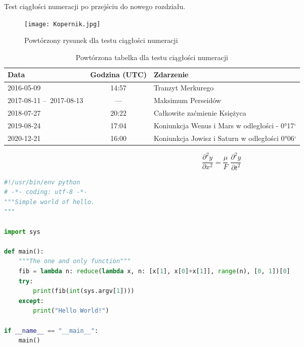 Test ciągłości numeracji po przejściu do nowego rozdziału.


\begin{figure}[!hb]
	\centering \texttt{[image: Kopernik.jpg]}
	\caption{Powtórzony rysunek dla testu ciągłości numeracji}
	\label{rys:kopernik2}
\end{figure}

\begin{table}[!b]
	\centering
	\begin{tabular}{p{2.5cm}c|l}
		Data                     & Godzina (UTC) & Zdarzenie                                     \\\hline
		2016-05-09               & 14:57         & Tranzyt Merkurego                             \\\hline
		2017-08-11 --~2017-08-13 & ---           & Maksimum Perseidów                            \\\hline
		2018-07-27               & 20:22         & Całkowite zaćmienie Księżyca                  \\\hline
		2019-08-24               & 17:04         & Koniunkcja Wenus i Mars w odległości - 0°17`  \\\hline
		2020-12-21               & 16:00         & Koniunkcja Jowisz i Saturn w odległości 0°06`
	\end{tabular}
	\caption{\label{tab:zjawiska2}Powtórzona tabelka dla testu ciągłości numeracji}
\end{table}

\begin{equation}
	\frac{\partial^2 y}{\partial x^2} = \frac{\mu}{F} \; \frac{\partial^2 y}{\partial t^2}
\end{equation}

\begin{lstlisting}[language=Python,
    caption={Powtórzony kod dla testu ciągłości numeracji},
    label={lst:hello2}]
#!/usr/bin/env python
# -*- coding: utf-8 -*-
"""Simple world of hello.
"""

import sys

def main():
    """The one and only function"""
    fib = lambda n: reduce(lambda x, n: [x[1], x[0]+x[1]], range(n), [0, 1])[0]
    try:
        print(fib(int(sys.argv[1])))
    except:
        print("Hello World!")

if __name__ == "__main__":
    main()
\end{lstlisting}


